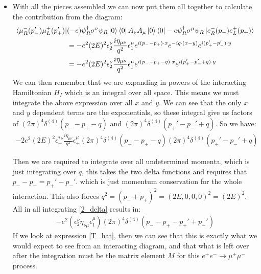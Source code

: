 \documentclass[11pt]{article}
\numberwithin{equation}{section}
\begin{document}
\begin{itemize}
     \item With all the pieces assembled we can now put them all together to calculate the contribution from the diagram:
     \begin{align*}
           \bra{\mu_R^{-}(p_-')\mu_L^{+}(p_+')}&(- e)\psi^{\dagger}_R\sigma^{\nu}\psi_R \ket{0}\bra{0} A_{\nu} A_{\mu}\ket{0}\bra{0}- e\psi^{\dagger}_R\sigma^{\mu}\psi_R\ket{e_R^{-}(p_-)e_L^{+}(p_+)} \\
           & = -e^2(2E)^2\epsilon_2^{\nu}\frac{i\eta_{\mu\nu}}{q^2}\epsilon^{\mu}_1e^{i(p_--p_+)\cdot x}e^{-iq \cdot (x - y)}e^{i(p_+'-p_-')\cdot y} \\
            & = -e^2(2E)^2\epsilon_2^{\nu}\frac{i\eta_{\mu\nu}}{q^2}\epsilon^{\mu}_1e^{i(p_--p_+-q)\cdot x}e^{i(p_+'-p_-'+q)\cdot y}
     \end{align*}
     We can then remember that we are expanding in powers of the interacting Hamiltonian $H_I$ which is an integral over all space. This means we must integrate the above expression over all $x$ and $y$. We can see that the only $x$ and $y$ dependent terms are the exponentials, so these integral give us factors of $(2\pi)^4\delta^{(4)}(p_--p_+ -q)$ and $(2\pi)^4\delta^{(4)}(p_+'-p_-' +q)$. So we have:
     \begin{align}
     \label{2_delta}
         -2e^2(2E)^2\epsilon^{\ast\nu}_+\frac{i\eta_{\mu\nu}}{q^2}\epsilon^{\mu}_+(2\pi)^4\delta^{(4)}(p_--p_+ -q)(2\pi)^4\delta^{(4)}(p_+'-p_-' +q)
     \end{align}

     Then we are required to integrate over all undetermined momenta, which is just integrating over $q$, this takes the two delta functions and requires that $p_--p_+ = p_+'-p_-'$. which is just momentum conservation for the whole interaction. This also forces $q^2 = (p_-+p_+)^2 = (2E,0,0,0)^2 = (2E)^2$. All in all integrating \ref{2_delta} results in:
     \begin{align*}
          -e^2(\epsilon_2^{\nu}\eta_{\nu\mu}\epsilon_{1}^{\mu})(2\pi)^4\delta^{(4)}(p_--p_+-p_+'+p_-')
     \end{align*}
      If we look at expression \ref{T_hat}, then we can see that this is exactly what we would expect to see from an interacting diagram, and that what is left over after the integration must be the matrix element $M$ for this $e^+e^- \rightarrow \mu^+\mu^-$ process. 


\end{itemize}
\end{document}
